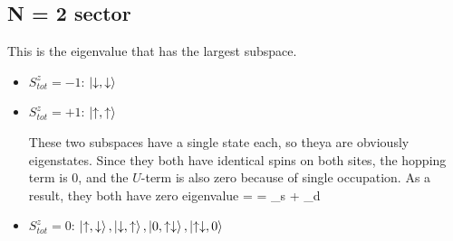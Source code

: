 \documentclass[12pt]{article}
\begin{document}
\subsection{N = 2 sector}

This is the eigenvalue that has the largest subspace.

\begin{itemize}
\item \(S_{tot}^z = -1\): \(\ket{\downarrow,\downarrow}\)
\item \(S_{tot}^z = +1\): \(\ket{\uparrow,\uparrow}\)

These two subspaces have a single state each, so theya are obviously eigenstates. Since they both have identical spins on both sites, the hopping term is 0, and the \(U\)-term is also zero because of single occupation. As a result, they both have zero eigenvalue
\beq
\ham \ket{\downarrow,\downarrow} = \ham \ket{\uparrow,\uparrow} = \epsilon_s + \epsilon_d
\eeq

\item \(S_{tot}^z = 0\):  \(\ket{\uparrow,\downarrow},\ket{\downarrow,\uparrow},\ket{0,\uparrow\downarrow},\ket{\uparrow\downarrow,0}\)
\end{itemize}
\end{document}
